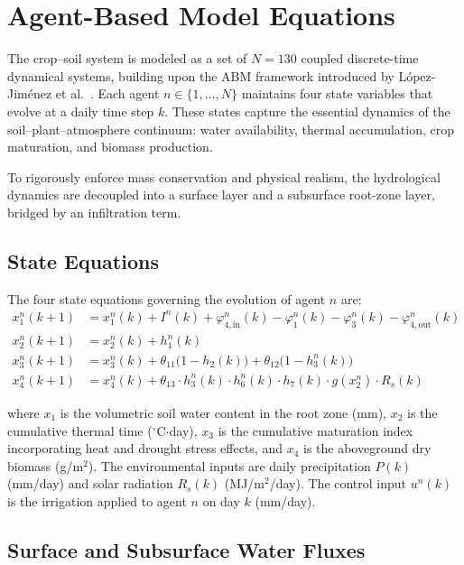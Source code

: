 \section{Agent-Based Model Equations}
\label{sec:abm_equations}

The crop--soil system is modeled as a set of $N = 130$ coupled discrete-time dynamical systems, building upon the ABM framework introduced by L\'{o}pez-Jim\'{e}nez et al.~\cite{Lopezjimenez2024}. Each agent $n \in \{1, \ldots, N\}$ maintains four state variables that evolve at a daily time step $k$. These states capture the essential dynamics of the soil--plant--atmosphere continuum: water availability, thermal accumulation, crop maturation, and biomass production.

To rigorously enforce mass conservation and physical realism, the hydrological dynamics are decoupled into a surface layer and a subsurface root-zone layer, bridged by an infiltration term.

\subsection{State Equations}
\label{sec:state_equations}

The four state equations governing the evolution of agent $n$ are:
\begin{align}
    x_1^n(k+1) &= x_1^n(k) + I^n(k) + \varphi_{4,\text{in}}^n(k) - \varphi_1^n(k) - \varphi_3^n(k) - \varphi_{4,\text{out}}^n(k) \label{eq:x1} \\
    x_2^n(k+1) &= x_2^n(k) + h_1^n(k) \label{eq:x2} \\
    x_3^n(k+1) &= x_3^n(k) + \theta_{11}\bigl(1 - h_2(k)\bigr) + \theta_{12}\bigl(1 - h_3^n(k)\bigr) \label{eq:x3} \\
    x_4^n(k+1) &= x_4^n(k) + \theta_{13} \cdot h_3^n(k) \cdot h_6^n(k) \cdot h_7(k) \cdot g(x_2^n) \cdot R_s(k) \label{eq:x4}
\end{align}

where $x_1$ is the volumetric soil water content in the root zone (mm), $x_2$ is the cumulative thermal time ($^{\circ}$C$\cdot$day), $x_3$ is the cumulative maturation index incorporating heat and drought stress effects, and $x_4$ is the aboveground dry biomass (g/m$^2$). The environmental inputs are daily precipitation $P(k)$ (mm/day) and solar radiation $R_s(k)$ (MJ/m$^2$/day). The control input $u^n(k)$ is the irrigation applied to agent $n$ on day $k$ (mm/day). 

\subsection{Surface and Subsurface Water Fluxes}
\label{sec:soil_fluxes}

